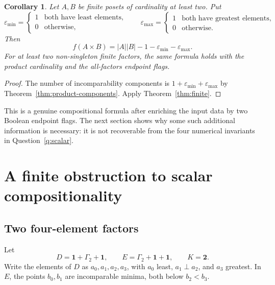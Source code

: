 \documentclass[11pt,letterpaper]{article}
\newtheorem{corollary}[theorem]{Corollary}
\theoremstyle{definition}
\theoremstyle{remark}
\newcommand{\epsmin}{\varepsilon_{\min}}
\newcommand{\epsmax}{\varepsilon_{\max}}
\newcommand{\one}{\mathbf{1}}
\newcommand{\chain}[1]{\mathbf{#1}}
\newcommand{\anti}[1]{\Gamma_{#1}}
\begin{document}
\begin{corollary}\label{cor:finite-product}
Let $A,B$ be finite posets of cardinality at least two. Put
\[
 \epsmin=\begin{cases}1&\text{both have least elements},\\0&\text{otherwise},\end{cases}
 \qquad
 \epsmax=\begin{cases}1&\text{both have greatest elements},\\0&\text{otherwise}.\end{cases}
\]
Then
\begin{equation}\label{eq:finite-product}
 \boxed{f(A\times B)=|A||B|-1-\epsmin-\epsmax.}
\end{equation}
For at least two non-singleton finite factors, the same formula holds
with the product cardinality and the all-factors endpoint flags.
\end{corollary}
\begin{proof}
The number of incomparability components is
$1+\epsmin+\epsmax$ by Theorem~\ref{thm:product-components}. Apply
Theorem~\ref{thm:finite}.
\end{proof}

This is a genuine compositional formula after enriching the input data by
two Boolean endpoint flags. The next section shows why some such additional
information is necessary: it is not recoverable from the four numerical
invariants in Question~\ref{q:scalar}.

\section{A finite obstruction to scalar compositionality}\label{sec:counterexample}

\subsection{Two four-element factors}
Let
\[
 D=\one+\anti2+\one,
 \qquad
 E=\anti2+\one+\one,
 \qquad K=\chain2.
\]
Write the elements of $D$ as $a_0,a_1,a_2,a_3$, with $a_0$ least,
$a_1\perp a_2$, and $a_3$ greatest. In $E$, the points $b_0,b_1$ are
incomparable minima, both below $b_2<b_3$.
\end{document}
